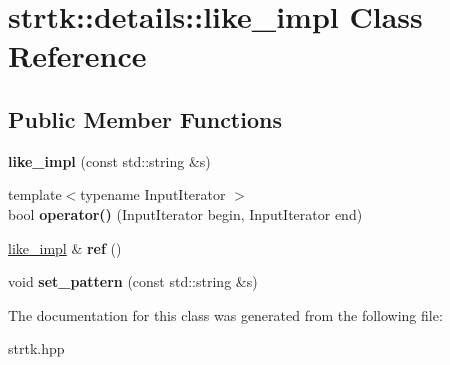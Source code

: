 \hypertarget{classstrtk_1_1details_1_1like__impl}{\section{strtk\-:\-:details\-:\-:like\-\_\-impl Class Reference}
\label{classstrtk_1_1details_1_1like__impl}
}
\subsection*{Public Member Functions}
\begin{DoxyCompactItemize}
\item 
\hypertarget{classstrtk_1_1details_1_1like__impl_a917583c34cca72d2aa268486b8fbd6df}{{\bfseries like\-\_\-impl} (const std\-::string \&s)}\label{classstrtk_1_1details_1_1like__impl_a917583c34cca72d2aa268486b8fbd6df}

\item 
\hypertarget{classstrtk_1_1details_1_1like__impl_a78612535388ea4430eec6a47f8cb4981}{{\footnotesize template$<$typename Input\-Iterator $>$ }\\bool {\bfseries operator()} (Input\-Iterator begin, Input\-Iterator end)}\label{classstrtk_1_1details_1_1like__impl_a78612535388ea4430eec6a47f8cb4981}

\item 
\hypertarget{classstrtk_1_1details_1_1like__impl_a6d8ab4c63ad8e2dc3e36eee6226581e1}{\hyperlink{classstrtk_1_1details_1_1like__impl}{like\-\_\-impl} \& {\bfseries ref} ()}\label{classstrtk_1_1details_1_1like__impl_a6d8ab4c63ad8e2dc3e36eee6226581e1}

\item 
\hypertarget{classstrtk_1_1details_1_1like__impl_a8bd1734465f1c450350cf60e2f9e01b0}{void {\bfseries set\-\_\-pattern} (const std\-::string \&s)}\label{classstrtk_1_1details_1_1like__impl_a8bd1734465f1c450350cf60e2f9e01b0}

\end{DoxyCompactItemize}


The documentation for this class was generated from the following file\-:\begin{DoxyCompactItemize}
\item 
strtk.\-hpp\end{DoxyCompactItemize}

